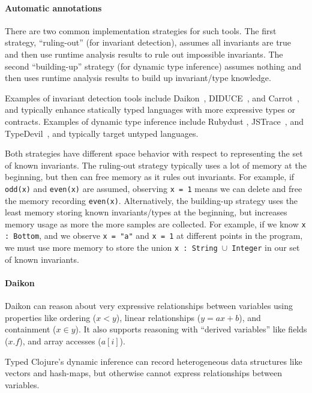 \paragraph{Automatic annotations}
There are two common implementation strategies for such tools. The first
strategy, ``ruling-out'' (for invariant detection), assumes all invariants are true 
and then use runtime analysis results to rule out
impossible invariants. The second ``building-up'' strategy (for dynamic type inference)
assumes nothing and then uses runtime analysis results to build up invariant/type knowledge.

Examples of invariant detection tools include Daikon~\cite{ernst2001dynamically},
DIDUCE~\cite{hangal2002tracking}, and Carrot~\cite{pytlik2003automated}, and
typically enhance statically typed languages with more expressive types or contracts.
Examples of dynamic type inference include Rubydust \cite{An10dynamicinference},
JSTrace~\cite{saftoiu2010jstrace}, and TypeDevil~\cite{pradel2015typedevil},
and typically target untyped languages.

Both strategies have different space behavior with respect to representing
the set of known invariants.
The ruling-out strategy typically uses a lot of memory at the beginning,
but then can free memory as it rules out invariants. For example, if
\texttt{odd(x)} and \texttt{even(x)} are assumed, observing \texttt{x = 1}
means we can delete and free the memory recording \texttt{even(x)}.
Alternatively, the building-up strategy uses the least memory storing
known invariants/types at the beginning, but increases memory usage
as more the more samples are collected. For example, if we know
\texttt{x : Bottom}, and we observe \texttt{x = "a"} and \texttt{x = 1}
at different points in the program, we must use more memory to
store the union \texttt{x : String $\cup$ Integer} in our set of known invariants.

\paragraph{Daikon}
Daikon can reason about very expressive relationships between variables
using properties like ordering ($x < y$), linear relationships ($y = ax + b$),
and containment ($x \in y$). It also supports reasoning with ``derived variables''
like fields ($x.f$), and array accesses ($a[i]$).

Typed Clojure's dynamic inference can record heterogeneous data structures
like vectors and hash-maps, but otherwise cannot express relationships
between variables.

